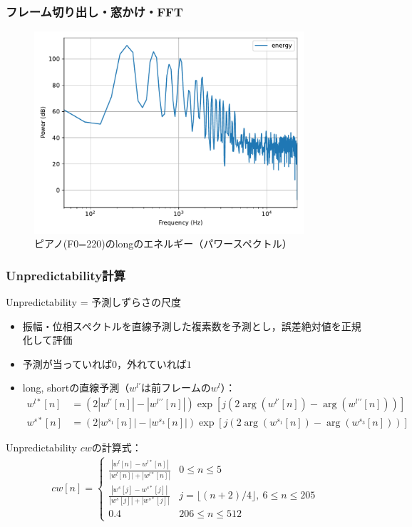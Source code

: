 \documentclass[14pt,xcolor=dvipsnames,table,dvipdfmx]{beamer}
\begin{document}
\begin{frame}[c]
    \frametitle{フレーム切り出し・窓かけ・FFT}
    \begin{figure}
        \includegraphics[width=100mm]{./figs/psyco_analyze_energy.pdf}
        \caption*{ピアノ(F0=220)のlongのエネルギー（パワースペクトル）}
    \end{figure}
\end{frame}

\begin{frame}[c]
    \frametitle{Unpredictability計算}
    Unpredictability = 予測しずらさの尺度
    \begin{itemize}
        \item 振幅・位相スペクトルを直線予測した複素数を予測とし，誤差絶対値を正規化して評価
        \item 予測が当っていれば$0$，外れていれば$1$
        \item long, shortの直線予測（$w^{l\prime}$は前フレームの$w^{l}$）：
            \footnotesize
            \begin{align}
                w^{l\ast}[n] &= (2|w^{l\prime}[n]| - |w^{l\prime\prime}[n]|) \exp[j (2\arg(w^{l\prime}[n]) - \arg(w^{l\prime\prime}[n]))] \\
                w^{s\ast}[n] &= (2|w^{s_{1}}[n]| - |w^{s_{3}}[n]|) \exp[j (2\arg(w^{s_{1}}[n]) - \arg(w^{s_{3}}[n]))]
            \end{align}
    \end{itemize}
    Unpredictability $cw$の計算式：
    \small
    \begin{align}
        cw[n] = \left\{ \begin{array}{cl}
            \frac{|w^{l}[n] - w^{l\ast}[n]|}{|w^{l}[n]| + |w^{l\ast}[n]|} & 0 \leq n \leq 5 \\
            \frac{|w^{s}[j] - w^{s\ast}[j]|}{|w^{s}[j]| + |w^{s\ast}[j]|} & j = \lfloor (n + 2)/4 \rfloor,\ 6 \leq n \leq 205 \\
            0.4 & 206 \leq n \leq 512
        \end{array} \right.
    \end{align}
\end{frame}
\end{document}
